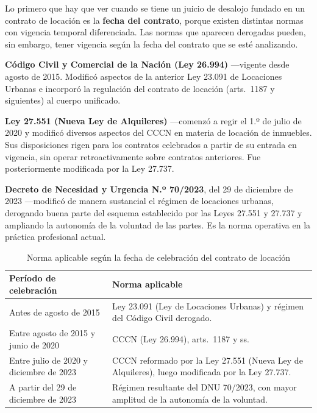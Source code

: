 \documentclass[12pt,oneside]{book}
\begin{document}
Lo primero que hay que ver cuando se tiene un juicio de desalojo fundado en un contrato de locación es la \textbf{fecha del contrato}, porque existen distintas normas con vigencia temporal diferenciada. Las normas que aparecen derogadas pueden, sin embargo, tener vigencia según la fecha del contrato que se esté analizando.

\begin{normacitada}
\textbf{Código Civil y Comercial de la Nación (Ley 26.994)} ---vigente desde agosto de 2015. Modificó aspectos de la anterior Ley 23.091 de Locaciones Urbanas e incorporó la regulación del contrato de locación (arts.\ 1187 y siguientes) al cuerpo unificado.
\end{normacitada}

\begin{normacitada}
\textbf{Ley 27.551 (Nueva Ley de Alquileres)} ---comenzó a regir el 1.º de julio de 2020 y modificó diversos aspectos del CCCN en materia de locación de inmuebles. Sus disposiciones rigen para los contratos celebrados a partir de su entrada en vigencia, sin operar retroactivamente sobre contratos anteriores. Fue posteriormente modificada por la Ley 27.737.
\end{normacitada}

\begin{normacitada}
\textbf{Decreto de Necesidad y Urgencia N.º 70/2023}, del 29 de diciembre de 2023 ---modificó de manera sustancial el régimen de locaciones urbanas, derogando buena parte del esquema establecido por las Leyes 27.551 y 27.737 y ampliando la autonomía de la voluntad de las partes. Es la norma operativa en la práctica profesional actual.
\end{normacitada}

\begin{table}[H]
\centering
\caption{Norma aplicable según la fecha de celebración del contrato de locación}
\begin{tabularx}{\textwidth}{>{\raggedright\arraybackslash}p{} X}
\toprule
\textbf{Período de celebración} & \textbf{Norma aplicable} \\
\midrule
Antes de agosto de 2015 & Ley 23.091 (Ley de Locaciones Urbanas) y régimen del Código Civil derogado. \\
Entre agosto de 2015 y junio de 2020 & CCCN (Ley 26.994), arts.\ 1187 y ss. \\
Entre julio de 2020 y diciembre de 2023 & CCCN reformado por la Ley 27.551 (Nueva Ley de Alquileres), luego modificada por la Ley 27.737. \\
A partir del 29 de diciembre de 2023 & Régimen resultante del DNU 70/2023, con mayor amplitud de la autonomía de la voluntad. \\
\bottomrule
\end{tabularx}
\end{table}
\end{document}
